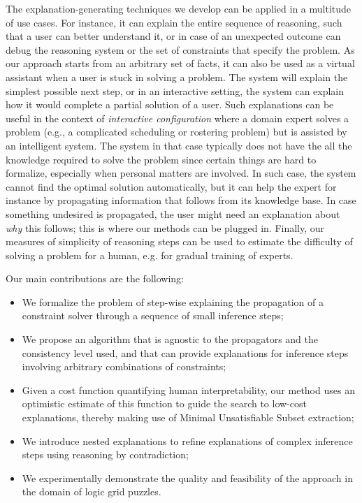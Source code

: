 The explanation-generating techniques we develop can be applied in a multitude of use cases. 
For instance, it can explain the entire sequence of reasoning, such that a user can better understand it, or in case of an unexpected outcome can debug the reasoning system or the set of constraints that specify the problem. 
As our approach starts from an arbitrary set of facts, it can also be used as a virtual assistant when a user is stuck in solving a problem.
The system will explain the simplest possible next step, or in an interactive setting, the system can explain how it would complete a partial solution of a user. Such explanations can be useful in the context of  \emph{interactive configuration} \cite{felfernig2014knowledge} where a domain expert solves a problem (e.g., a complicated scheduling or rostering problem) but is assisted by an intelligent system. 
The system in that case typically does not have the all the knowledge required to solve the problem since certain things are hard to formalize, especially when personal matters are involved. In such case, the system cannot find the optimal solution automatically, but it can help the expert for instance by propagating information that follows from its knowledge base. In case something undesired is propagated, the user might need an explanation about \emph{why} this follows; this is where our methods can be plugged in.
% 
% 
Finally, our measures of simplicity of reasoning steps can be used to estimate the difficulty of solving a problem for a human, e.g. for gradual training of experts.


Our main contributions are the following:
\begin{itemize}
	\item We formalize the problem of step-wise explaining the propagation of a constraint solver through a sequence of small inference steps;
	\item We propose an algorithm that is agnostic to the propagators and the consistency level used, and that can provide explanations for inference steps involving arbitrary combinations of constraints;
	\item Given a cost function quantifying human interpretability, our method uses an optimistic estimate of this function to guide the search to low-cost explanations, thereby making use of Minimal Unsatisfiable Subset extraction;
	\item We introduce nested explanations to refine explanations of complex inference steps using reasoning by contradiction;
	\item We experimentally demonstrate the quality and feasibility of the approach in the domain of logic grid puzzles.
\end{itemize}


